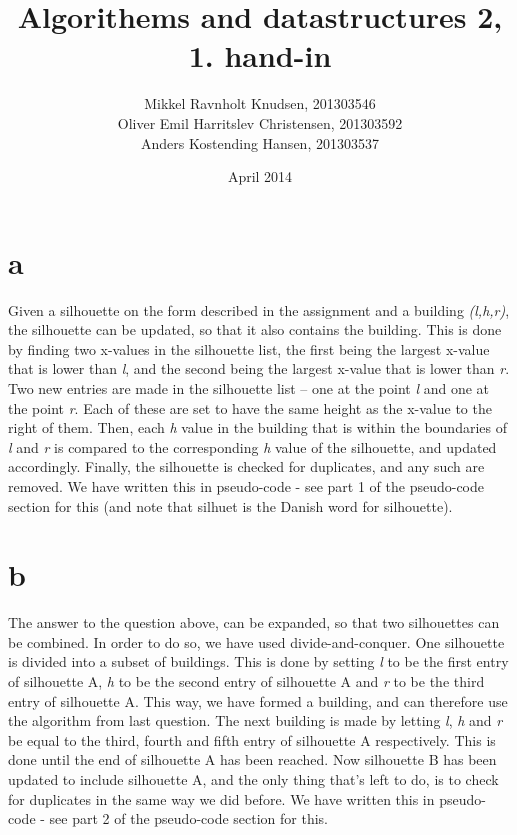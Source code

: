 \documentclass[a4paper,oneside,article,11pt]{memoir}
\title{Algorithems and datastructures 2, 1. hand-in}
\author{Mikkel Ravnholt Knudsen, 201303546\\
Oliver Emil Harritslev Christensen, 201303592\\
Anders Kostending Hansen, 201303537}
\date{April 2014}
\begin{document}
\maketitle

\chapter*{a}
Given a silhouette on the form described in the assignment and a building \emph{(l,h,r)}, the silhouette can be updated, so that it also contains the building. This is done by finding two x-values in the silhouette list, the first being the largest x-value that is lower than \emph{l}, and the second being the largest x-value that is lower than \emph{r}. Two new entries are made in the silhouette list -- one at the point \emph{l} and one at the point \emph{r}. Each of these are set to have the same height as the x-value to the right of them. Then, each \emph{h} value in the building that is within the boundaries of \emph{l} and \emph{r} is compared to the corresponding \emph{h} value of the silhouette, and updated accordingly. Finally, the silhouette is checked for duplicates, and any such are removed. We have written this in pseudo-code - see part 1 of the pseudo-code section for this (and note that silhuet is the Danish word for silhouette).

\chapter*{b}
The answer to the question above, can be expanded, so that two silhouettes can be combined. In order to do so, we have used divide-and-conquer. One silhouette is divided into a subset of buildings. This is done by setting \emph{l} to be the first entry of silhouette A, \emph{h} to be the second entry of silhouette A and \emph{r} to be the third entry of silhouette A. This way, we have formed a building, and can therefore use the algorithm from last question. The next building is made by letting \emph{l}, \emph{h} and \emph{r} be equal to the third, fourth and fifth entry of silhouette A respectively. This is done until the end of silhouette A has been reached. Now silhouette B has been updated to include silhouette A, and the only thing that's left to do, is to check for duplicates in the same way we did before. We have written this in pseudo-code - see part 2 of the pseudo-code section for this.
\end{document}
